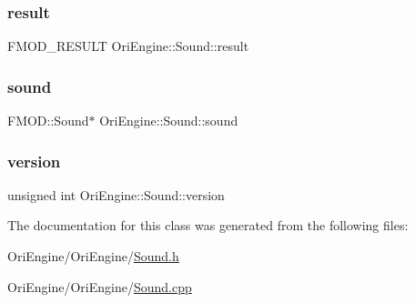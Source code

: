 \hypertarget{class_ori_engine_1_1_sound_ab86a49dbdac39a19e6c6aae872652d3e}{}\label{class_ori_engine_1_1_sound_ab86a49dbdac39a19e6c6aae872652d3e} 
\subsubsection{\texorpdfstring{result}{result}}
{\footnotesize\ttfamily F\+M\+O\+D\+\_\+\+R\+E\+S\+U\+LT Ori\+Engine\+::\+Sound\+::result}

\hypertarget{class_ori_engine_1_1_sound_a2ddb42221696bf2d74cdf3b5b560fb3e}{}\label{class_ori_engine_1_1_sound_a2ddb42221696bf2d74cdf3b5b560fb3e} 
\subsubsection{\texorpdfstring{sound}{sound}}
{\footnotesize\ttfamily F\+M\+O\+D\+::\+Sound$\ast$ Ori\+Engine\+::\+Sound\+::sound}

\hypertarget{class_ori_engine_1_1_sound_ac80240cf5908a2a77af263bd359b0349}{}\label{class_ori_engine_1_1_sound_ac80240cf5908a2a77af263bd359b0349} 
\subsubsection{\texorpdfstring{version}{version}}
{\footnotesize\ttfamily unsigned int Ori\+Engine\+::\+Sound\+::version}



The documentation for this class was generated from the following files\+:\begin{DoxyCompactItemize}
\item 
Ori\+Engine/\+Ori\+Engine/\hyperlink{_sound_8h}{Sound.\+h}\item 
Ori\+Engine/\+Ori\+Engine/\hyperlink{_sound_8cpp}{Sound.\+cpp}\end{DoxyCompactItemize}
